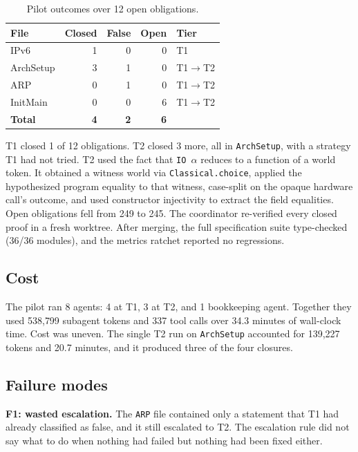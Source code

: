 \documentclass[sigconf,nonacm]{acmart}
\begin{document}
\begin{table}[t]
\caption{Pilot outcomes over 12 open obligations.}
\label{tab:pilot}
\small
\begin{tabular}{lrrrl}
\toprule
\textbf{File} & \textbf{Closed} & \textbf{False} & \textbf{Open} & \textbf{Tier} \\
\midrule
IPv6     & 1 & 0 & 0 & T1 \\
ArchSetup & 3 & 1 & 0 & T1$\to$T2 \\
ARP      & 0 & 1 & 0 & T1$\to$T2 \\
InitMain & 0 & 0 & 6 & T1$\to$T2 \\
\midrule
\textbf{Total} & \textbf{4} & \textbf{2} & \textbf{6} & \\
\bottomrule
\end{tabular}
\end{table}

T1 closed 1 of 12 obligations. T2 closed 3 more, all in \texttt{ArchSetup}, with a strategy T1 had not tried. T2 used the fact that \texttt{IO $\alpha$} reduces to a function of a world token. It obtained a witness world via \texttt{Classical.choice}, applied the hypothesized program equality to that witness, case-split on the opaque hardware call's outcome, and used constructor injectivity to extract the field equalities. Open obligations fell from 249 to 245. The coordinator re-verified every closed proof in a fresh worktree. After merging, the full specification suite type-checked (36/36 modules), and the metrics ratchet reported no regressions.

\subsection{Cost}
The pilot ran 8 agents: 4 at T1, 3 at T2, and 1 bookkeeping agent. Together they used 538{,}799 subagent tokens and 337 tool calls over 34.3 minutes of wall-clock time. Cost was uneven. The single T2 run on \texttt{ArchSetup} accounted for 139{,}227 tokens and 20.7 minutes, and it produced three of the four closures.

\subsection{Failure modes}
\textbf{F1: wasted escalation.} The \texttt{ARP} file contained only a statement that T1 had already classified as false, and it still escalated to T2. The escalation rule did not say what to do when nothing had failed but nothing had been fixed either.
\end{document}

